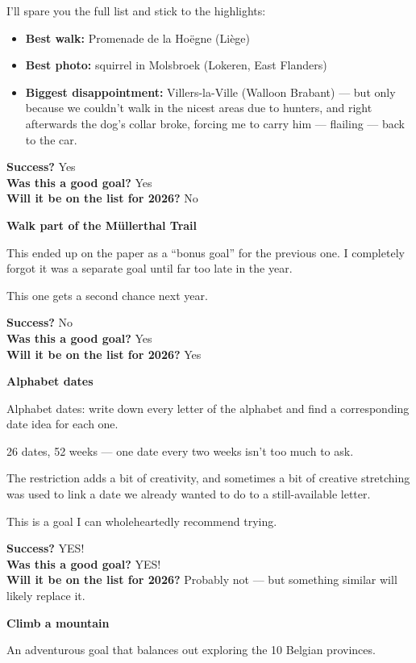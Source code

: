 \documentclass[12pt]{article}
\begin{document}
I'll spare you the full list and stick to the highlights:

\begin{itemize}
\item
  \textbf{Best walk:} Promenade de la Hoëgne (Liège)
\item
  \textbf{Best photo:} squirrel in Molsbroek (Lokeren, East Flanders)
\item
  \textbf{Biggest disappointment:} Villers-la-Ville (Walloon Brabant)
  --- but only because we couldn't walk in the nicest areas due to
  hunters, and right afterwards the dog's collar broke, forcing me to
  carry him --- flailing --- back to the car.
\end{itemize}

\textbf{Success?} Yes\\
\textbf{Was this a good goal?} Yes\\
\textbf{Will it be on the list for 2026?} No

\textbf{Walk part of the Müllerthal Trail}

This ended up on the paper as a ``bonus goal'' for the previous one. I
completely forgot it was a separate goal until far too late in the year.

This one gets a second chance next year.

\textbf{Success?} No\\
\textbf{Was this a good goal?} Yes\\
\textbf{Will it be on the list for 2026?} Yes

\textbf{Alphabet dates}

Alphabet dates: write down every letter of the alphabet and find a
corresponding date idea for each one.

26 dates, 52 weeks --- one date every two weeks isn't too much to ask.

The restriction adds a bit of creativity, and sometimes a bit of
creative stretching was used to link a date we already wanted to do to a
still-available letter.

This is a goal I can wholeheartedly recommend trying.

\textbf{Success?} YES!\\
\textbf{Was this a good goal?} YES!\\
\textbf{Will it be on the list for 2026?} Probably not --- but something
similar will likely replace it.

\textbf{Climb a mountain}

An adventurous goal that balances out exploring the 10 Belgian
provinces.
\end{document}
